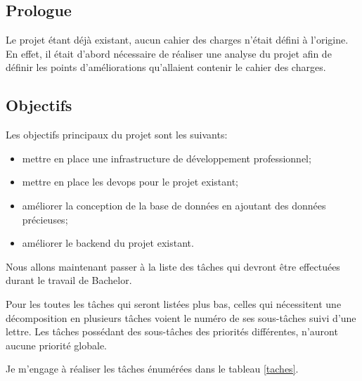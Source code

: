 \documentclass[
    iai, %
    il, %
]{heig-tb}
\begin{document}
\subsection{Prologue}

Le projet étant déjà existant, aucun cahier des charges n'était défini à l'origine. En effet, il était d'abord nécessaire de réaliser une analyse du projet afin de définir les points d'améliorations qu'allaient contenir le cahier des charges.

\subsection{Objectifs \label{objectifs}}

Les objectifs principaux du projet sont les suivants:
\begin{itemize}
    \item mettre en place une infrastructure de développement professionnel;
    \item mettre en place les \Gls{devops} pour le projet existant;
    \item améliorer la conception de la base de données en ajoutant des données précieuses;
    \item améliorer le \Gls{backend} du projet existant.
\end{itemize}

\newpage
Nous allons maintenant passer à la liste des tâches qui devront être effectuées durant le travail de Bachelor.

Pour les toutes les tâches qui seront listées plus bas, celles qui nécessitent une décomposition en plusieurs tâches voient le numéro de ses sous-tâches suivi d'une lettre. Les tâches possédant des sous-tâches des priorités différentes, n'auront aucune priorité globale.

Je m'engage à réaliser les tâches énumérées dans le tableau \ref{taches}.
\end{document}
